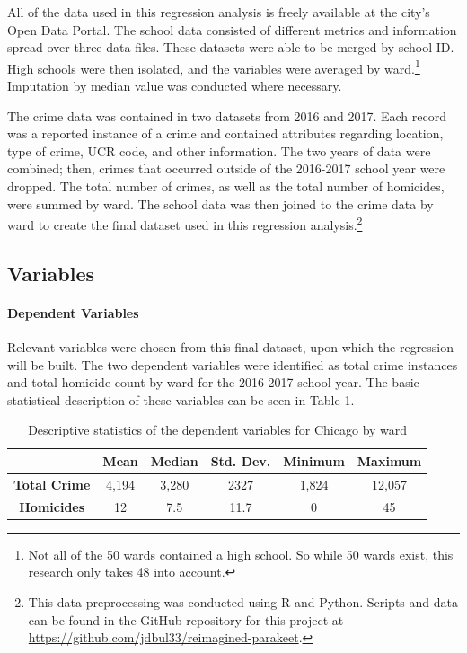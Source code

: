 \documentclass[12pt]{article}
\begin{document}
All of the data used in this regression analysis is freely available at the city's Open Data Portal.\cite{c1data}\cite{c2data}\cite{s1data}\cite{s2data}\cite{s3data}  The school data consisted of different metrics and information spread over three data files.  These datasets were able to be merged by school ID.  High schools were then isolated, and the variables were averaged by ward.\footnote{Not all of the 50 wards contained a high school.  So while 50 wards exist, this research only takes 48 into account.}  Imputation by median value was conducted where necessary.

\par

The crime data was contained in two datasets from 2016 and 2017.  Each record was a reported instance of a crime and contained attributes regarding location, type of crime, UCR code, and other information.  The two years of data were combined; then, crimes that occurred outside of the 2016-2017 school year were dropped.  The total number of crimes, as well as the total number of homicides, were summed by ward.  The school data was then joined to the crime data by ward to create the final dataset used in this regression analysis.\footnote{This data preprocessing was conducted using R and Python.  Scripts and data can be found in the GitHub repository for this project at \href{https://github.com/jdbul33/reimagined-parakeet}{https://github.com/jdbul33/reimagined-parakeet}.}


\subsection{Variables}

\paragraph{Dependent Variables}
Relevant variables were chosen from this final dataset, upon which the regression will be built.  The two dependent variables were identified as total crime instances and total homicide count by ward for the 2016-2017 school year.  The basic statistical description of these variables can be seen in Table 1.

\begin{center}
	\begin{table}[h]
	\begin{tabular}{ c | c | c | c | c | c }
		
		 & \textbf{Mean} & \textbf{Median} & \textbf{Std. Dev.} & \textbf{Minimum} & \textbf{Maximum} \\ 
		 \hline
		 \textbf{Total Crime} & 4,194 & 3,280 & 2327 & 1,824 & 12,057 \\
		 \textbf{Homicides} & 12 & 7.5 & 11.7 & 0 & 45 \\
    
	\end{tabular}
\caption{Descriptive statistics of the dependent variables for Chicago by ward}
\end{table}
\end{center}  
\end{document}
